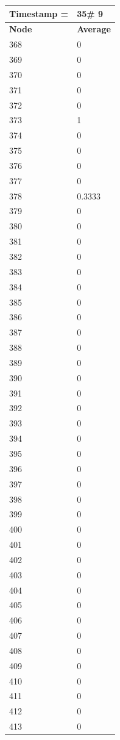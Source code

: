 \begin{tabular}{|l||l|}
\hline
\textbf{Timestamp =} & \textbf{35}\# 9\\\hline
	\textbf{Node} & \textbf{Average} \\ \hline
\hline
	368 & 0 \\ \hline
	369 & 0 \\ \hline
	370 & 0 \\ \hline
	371 & 0 \\ \hline
	372 & 0 \\ \hline
	373 & 1 \\ \hline
	374 & 0 \\ \hline
	375 & 0 \\ \hline
	376 & 0 \\ \hline
	377 & 0 \\ \hline
	378 & 0.3333 \\ \hline
	379 & 0 \\ \hline
	380 & 0 \\ \hline
	381 & 0 \\ \hline
	382 & 0 \\ \hline
	383 & 0 \\ \hline
	384 & 0 \\ \hline
	385 & 0 \\ \hline
	386 & 0 \\ \hline
	387 & 0 \\ \hline
	388 & 0 \\ \hline
	389 & 0 \\ \hline
	390 & 0 \\ \hline
	391 & 0 \\ \hline
	392 & 0 \\ \hline
	393 & 0 \\ \hline
	394 & 0 \\ \hline
	395 & 0 \\ \hline
	396 & 0 \\ \hline
	397 & 0 \\ \hline
	398 & 0 \\ \hline
	399 & 0 \\ \hline
	400 & 0 \\ \hline
	401 & 0 \\ \hline
	402 & 0 \\ \hline
	403 & 0 \\ \hline
	404 & 0 \\ \hline
	405 & 0 \\ \hline
	406 & 0 \\ \hline
	407 & 0 \\ \hline
	408 & 0 \\ \hline
	409 & 0 \\ \hline
	410 & 0 \\ \hline
	411 & 0 \\ \hline
	412 & 0 \\ \hline
	413 & 0 \\ \hline
\end{tabular}

